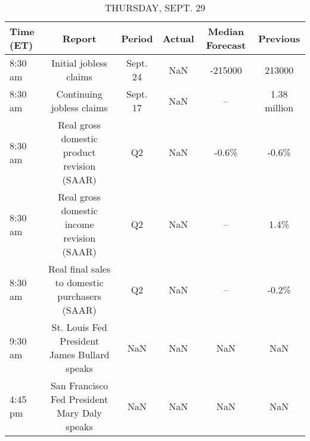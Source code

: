 \documentclass{book}
\begin{document}
  
  \begin{table}[htbp]%
  \caption{THURSDAY, SEPT. 29}%
  \centering%
  \begin{adjustbox}{width=1\textwidth}%
  \begin{tabular}{lccccc}
  \toprule
  Time (ET) &                                         Report &   Period & Actual & Median Forecast &     Previous \\
  \midrule
    8:30 am &                         Initial jobless claims & Sept. 24 &    NaN &         -215000 &       213000 \\
    8:30 am &                      Continuing jobless claims & Sept. 17 &    NaN &              -- & 1.38 million \\
    8:30 am &    Real gross domestic product revision (SAAR) &       Q2 &    NaN &           -0.6\% &        -0.6\% \\
    8:30 am &     Real gross domestic income revision (SAAR) &       Q2 &    NaN &              -- &         1.4\% \\
    8:30 am & Real final sales to domestic purchasers (SAAR) &       Q2 &    NaN &              -- &        -0.2\% \\
    9:30 am &   St. Louis Fed President James Bullard speaks &      NaN &    NaN &             NaN &          NaN \\
    4:45 pm &   San Francisco Fed President Mary Daly speaks &      NaN &    NaN &             NaN &          NaN \\
  \bottomrule
  \end{tabular}
  \end{adjustbox}%
  \end{table}
  
  
\end{document}
